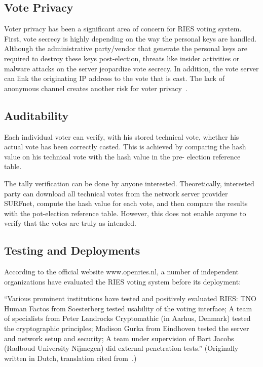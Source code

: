 \subsection{Vote Privacy}

Voter privacy has been a significant area of concern for RIES voting
system. First, vote secrecy is highly depending on the way the
personal keys are handled. Although the administrative party/vendor
that generate the personal keys are required to destroy these keys
post-election, threats like insider activities or malware attacks on
the server jeopardize vote secrecy. In addition, the vote server can
link the originating IP address to the vote that is cast. The lack of
anonymous channel creates another risk for voter
privacy~\cite{hubbers2008}.

\subsection{Auditability}

Each individual voter can verify, with his stored technical vote,
whether his actual vote has been correctly casted. This is achieved by
comparing the hash value on his technical vote with the hash value in
the pre- election reference table.

The tally verification can be done by anyone
interested. Theoretically, interested party can download all technical
votes from the network server provider SURFnet, compute the hash value
for each vote, and then compare the results with the pot-election
reference table. However, this does not enable anyone to verify that
the votes are truly as intended.

\subsection{Testing and Deployments}

According to the official website
\textcolor[rgb]{0.078431375,0.3254902,0.6901961}{www.openries.nl, }a
number of independent organizations have evaluated the RIES voting
system before its deployment:

``Various prominent institutions have tested and positively evaluated
RIES: TNO Human Factos from Soesterberg tested usability of the voting
interface; A team of specialists from Peter Landrocks Cryptomathic (in
Aarhus, Denmark) tested the cryptographic principles; Madison Gurka
from Eindhoven tested the server and network setup and security; A
team under supervision of Bart Jacobs (Radboud University Nijmegen)
did external penetration tests.'' (Originally written in Dutch,
translation cited from~\cite{gonggrijp2009}.)

